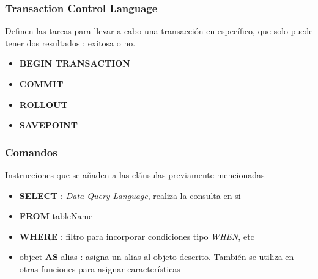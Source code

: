 \subsubsection{Transaction Control Language}
Definen las tareas para llevar a cabo una transacción en específico, que solo puede tener dos resultados : exitosa o no. 
\begin{itemize}
    \item {\textbf{BEGIN TRANSACTION}}
    \item {\textbf{COMMIT}}
    \item {\textbf{ROLLOUT}}
    \item {\textbf{SAVEPOINT}}
\end{itemize}

\subsubsection{Comandos}
Instrucciones que se añaden a las cláusulas previamente mencionadas
\begin{itemize}
    \item {\textbf{SELECT} : \textit{Data Query Language}, realiza la consulta en si}
    \item {\textbf{FROM} tableName}
    \item {\textbf{WHERE} : filtro para incorporar condiciones tipo \textit{WHEN}, etc}
    \item {object \textbf{AS} alias : asigna un alias al objeto descrito. También se utiliza en otras funciones para asignar características}
\end{itemize}

